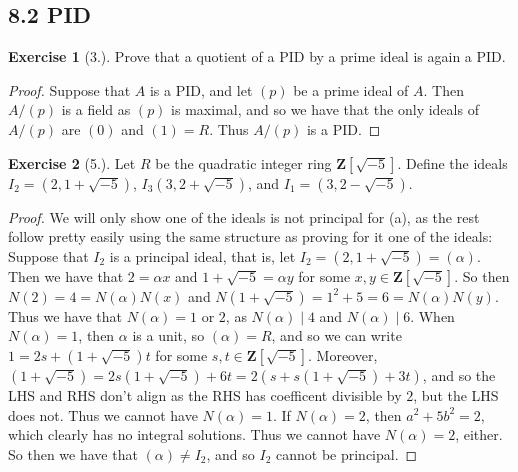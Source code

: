\documentclass[9pt,reqno]{amsart}
\theoremstyle{definition}
\newtheorem{exercise}{Exercise}[section]
\newcommand{\zz}{\mathbf Z}
\begin{document}
\subsection{8.2 PID}
\begin{exercise}[3.] 
	Prove that a quotient of a PID by a prime ideal is again a PID.
\end{exercise}
\begin{proof}
	Suppose that $A$ is a PID, and let $(p)$ be a prime ideal of $A$. Then $A/(p)$ is a field as $(p)$ is maximal, and so we have that the only ideals of $A/(p)$ are $(0)$ and $(1) = R$. Thus $A/(p)$ is a PID. 
\end{proof}
\begin{exercise}[5.]
	Let $R$ be the quadratic integer ring $\zz[\sqrt{-5}]$. Define the ideals $I_2 = (2, 1+ \sqrt{-5})$, $I_3(3, 2+\sqrt{-5})$, and $I_1 = (3, 2-\sqrt{-5})$.
	\begin{proof}
		We will only show one of the ideals is not principal for (a), as the rest follow pretty easily using the same structure as proving for it one of the ideals: Suppose that $I_2$ is a principal ideal, that is, let $I_2 = (2, 1+ \sqrt{-5})= (\alpha) $. Then we have that $2 = \alpha x$ and $1+ \sqrt{-5} = \alpha y$ for some $x, y \in \zz[\sqrt{-5}]$. So then $N(2) = 4 = N(\alpha ) N(x)$ and $N(1+\sqrt{-5}) = 1^2 + 5 = 6 =   N(\alpha) N(y) $. Thus we have that $N (\alpha) = 1$ or $2$, as $N(\alpha) \mid 4$ and $N (\alpha) \mid 6$. When $N(\alpha) = 1$, then $\alpha$ is a unit, so $(\alpha) = R$, and so we can write $1 = 2s + (1+\sqrt{-5})t$ for some $s, t \in \zz[\sqrt{-5}]$. Moreover, $(1+\sqrt{-5}) = 2s(1+ \sqrt{-5}) + 6t = 2(s+s(1+\sqrt{-5}) + 3t)$, and so the LHS and RHS don't align as the RHS has coefficent divisible by $2$, but the LHS does not. Thus we cannot have $N(\alpha) = 1$. If $N(\alpha) = 2$, then $a^2 + 5 b^2 = 2$, which clearly has no integral solutions. Thus we cannot have $N(\alpha) = 2$, either. So then we have that $(\alpha) \neq I_2$, and so $I_2$ cannot be principal. 
			
	\end{proof}
\end{exercise}
\end{document}

